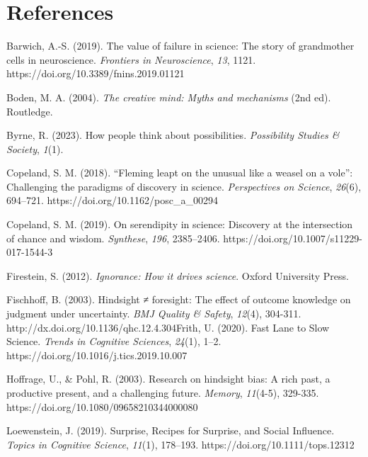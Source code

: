 \documentclass[authordate, commentary]{jote-new-article}
\begin{document}
  





	\section{References}







	Barwich, A.-S. (2019). The value of failure in science: The story of grandmother cells in neuroscience. \emph{Frontiers in Neuroscience}, \emph{13}, 1121. https://doi.org/10.3389/fnins.2019.01121



	Boden, M. A. (2004). \emph{The creative mind: Myths and mechanisms} (2nd ed). Routledge.



	Byrne, R. (2023). How people think about possibilities. \emph{Possibility Studies \& Society}, \emph{1}(1).



	Copeland, S. M. (2018). “Fleming leapt on the unusual like a weasel on a vole”: Challenging the paradigms of discovery in science. \emph{Perspectives on Science}, \emph{26}(6), 694--721. https://doi.org/10.1162/posc\_a\_00294



	Copeland, S. M. (2019). On serendipity in science: Discovery at the intersection of chance and wisdom. \emph{Synthese}, \emph{196}, 2385--2406. https://doi.org/10.1007/s11229-017-1544-3



	Firestein, S. (2012). \emph{Ignorance: How it drives science}. Oxford University Press.



	Fischhoff, B. (2003). Hindsight ≠ foresight: The effect of outcome knowledge on judgment under uncertainty. \emph{BMJ Quality \& Safety}, \emph{12}(4), 304-311. http://dx.doi.org/10.1136/qhc.12.4.304Frith, U. (2020). Fast Lane to Slow Science. \emph{Trends in Cognitive Sciences}, \emph{24}(1), 1--2. https://doi.org/10.1016/j.tics.2019.10.007



	Hoffrage, U., \& Pohl, R. (2003). Research on hindsight bias: A rich past, a productive present, and a challenging future. \emph{Memory}, \emph{11}(4-5), 329-335. https://doi.org/10.1080/09658210344000080



	Loewenstein, J. (2019). Surprise, Recipes for Surprise, and Social Influence. \emph{Topics in Cognitive Science}, \emph{11}(1), 178--193. https://doi.org/10.1111/tops.12312
\end{document}
